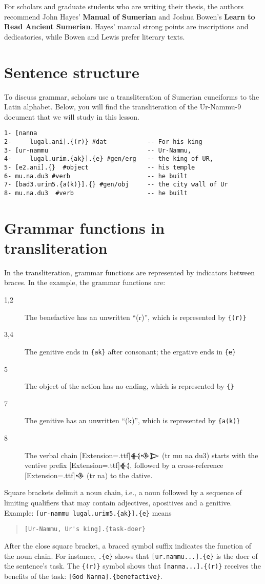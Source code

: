 \documentclass[a4paper,12pt]{book}
\newcommand{\fcn}{\setmainfont{Akkadian}[Extension=.ttf]}
\begin{document}
For scholars and graduate students who are
writing their thesis, the authors recommend
John Hayes' {\bf Manual of Sumerian} and
Joshua Bowen's {\bf Learn to Read Ancient Sumerian}.
Hayes' manual strong points are inscriptions
and dedicatories, while Bowen and Lewis prefer
literary texts.

\section{Sentence structure}
To discuss grammar, scholars use a transliteration
of Sumerian cuneiforms to the Latin alphabet.
Below, you will find the transliteration of
the Ur-Nammu-9 document that we will study
in this lesson.
\begin{verbatim}
1- [nanna
2-     lugal.ani].{(r)} #dat           -- For his king
3- [ur-nammu                           -- Ur-Nammu,
4-     lugal.urim.{ak}].{e} #gen/erg   -- the king of UR,
5- [e2.ani].{}  #object                -- his temple
6- mu.na.du3 #verb                     -- he built
7- [bad3.urim5.{a(k)}].{} #gen/obj     -- the city wall of Ur
8- mu.na.du3  #verb                    -- he built
\end{verbatim}

\section{Grammar functions in transliteration}

In the transliteration, grammar functions are
represented by indicators between braces.
In the example, the grammar functions are:
\begin{description}
\item[1,2] The benefactive has an unwritten ``(r)'',
  which is represented by \verb|{(r)}|
\item[3,4] The genitive ends in \verb|{ak}| after
  consonant; the ergative ends in \verb|{e}|
\item[5] The object of the action has no ending,
  which is represented by \verb|{}|
\item[7] The genitive has an unwritten ``(k)'',
  which is represented by \verb|{a(k)}|
\item[8] The verbal chain {\fcn 𒈬𒈾𒆕} (tr mu na du3)
  starts with the ventive prefix {\fcn 𒈬},
  followed by a cross-reference {\fcn 𒈾} (tr na)
  to the dative.
\end{description}

Square brackets delimit a noun chain, i.e.,
a noun followed by a sequence of limiting
qualifiers that may contain adjectives,
apositives and a genitive.
Example: \verb|[ur-nammu lugal.urim5.{ak}].{e}|
means
\begin{quote}
\begin{verbatim}
[Ur-Nammu, Ur's king].{task-doer}
\end{verbatim}
\end{quote}
After the close square bracket, a braced symbol
suffix indicates the function of the noun chain.
For instance, \verb|.{e}| shows that
\verb|[ur.nammu...].{e}| is the doer of
the sentence's task. The \verb|{(r)}| symbol
shows that \verb|[nanna...].{(r)}| receives
the benefits of the task:
\verb|[God Nanna].{benefactive}|.
\end{document}

